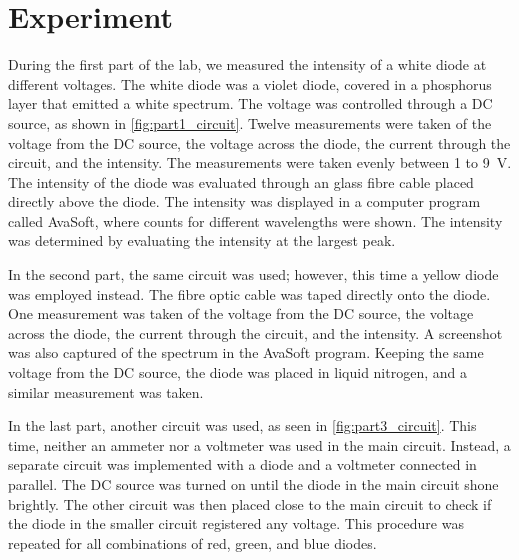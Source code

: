 \section{Experiment}
During the first part of the lab, we measured the intensity of a white diode at different voltages. The white diode was a violet diode, covered in a phosphorus layer that emitted a white spectrum. The voltage was controlled through a DC source, as shown in \autoref{fig:part1_circuit}. Twelve measurements were taken of the voltage from the DC source, the voltage across the diode, the current through the circuit, and the intensity. The measurements were taken evenly between 1 to \SI{9}{\volt}. The intensity of the diode was evaluated through an glass fibre cable placed directly above the diode. The intensity was displayed in a computer program called AvaSoft, where counts for different wavelengths were shown. The intensity was determined by evaluating the intensity at the largest peak.

In the second part, the same circuit was used; however, this time a yellow diode was employed instead. The fibre optic cable was taped directly onto the diode. One measurement was taken of the voltage from the DC source, the voltage across the diode, the current through the circuit, and the intensity. A screenshot was also captured of the spectrum in the AvaSoft program. Keeping the same voltage from the DC source, the diode was placed in liquid nitrogen, and a similar measurement was taken.

In the last part, another circuit was used, as seen in \autoref{fig:part3_circuit}. This time, neither an ammeter nor a voltmeter was used in the main circuit. Instead, a separate circuit was implemented with a diode and a voltmeter connected in parallel. The DC source was turned on until the diode in the main circuit shone brightly. The other circuit was then placed close to the main circuit to check if the diode in the smaller circuit registered any voltage. This procedure was repeated for all combinations of red, green, and blue diodes.



